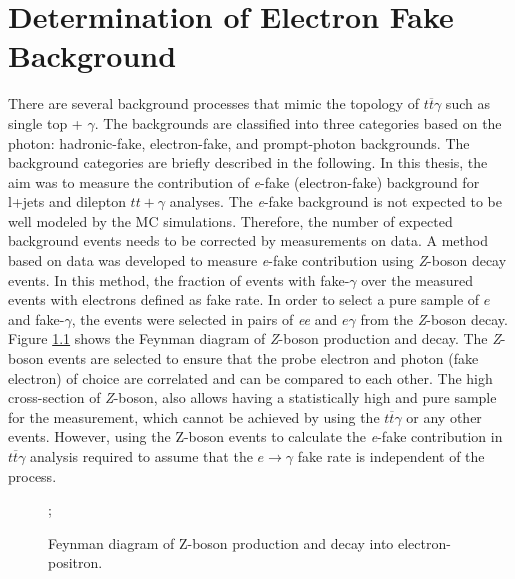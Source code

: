
\chapter{Determination of Electron Fake Background} %
\label{Chapter4} %

There are several background processes that mimic the topology of $t\overline{t}\gamma$ such as single top + $\gamma$. The backgrounds are classified into three categories based on the photon: hadronic-fake, electron-fake, and prompt-photon backgrounds. The background categories are briefly described in the following. In this thesis, the aim was to measure the contribution of \textit{e}-fake (electron-fake) background for l+jets and dilepton $tt+\gamma$ analyses. The \textit{e}-fake background is not expected to be well modeled by the MC simulations. Therefore, the number of expected background events needs to be corrected by measurements on data. A method based on data was developed to measure \textit{e}-fake contribution using \textit{Z}-boson decay events. In this method, the fraction of events with fake-$\gamma$ over the measured events with electrons defined as fake rate. In order to select a pure sample of $e$ and fake-$\gamma$, the events were selected in pairs of \textit{ee} and $e\gamma$ from the \textit{Z}-boson decay. Figure \ref{fig:FeynmanDiagramZee} shows the Feynman diagram of \textit{Z}-boson production and decay. The \textit{Z}-boson events are selected to ensure that the probe electron and photon (fake electron) of choice are correlated  and can be compared to each other. The high cross-section of \textit{Z}-boson, also allows having a statistically high and pure sample for the measurement, which cannot be achieved by using the $t\overline{t}\gamma$ or any other events. However, using the Z-boson events to calculate the \textit{e}-fake contribution in $t\overline{t}\gamma$ analysis required to assume that the $e \rightarrow \gamma$ fake rate is independent of the process.

\begin{figure}[H]
\centering
{};
\decoRule
\caption{Feynman diagram of Z-boson production and decay into electron-positron.}
\label{fig:FeynmanDiagramZee}
\end{figure}

